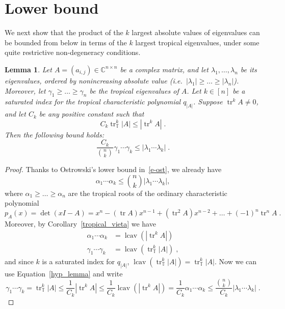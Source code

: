 \documentclass[a4paper]{amsart}
\theoremstyle{definition}
\theoremstyle{plain}
\newtheorem{lem}[thm]{Lemma}
\theoremstyle{remark}
\begin{document}
\section{Lower bound}\label{sec-lower}
We next show that the product of the $k$ largest absolute values of eigenvalues
can be bounded from below in terms of the $k$ largest tropical
eigenvalues, under some quite restrictive non-degeneracy conditions.
\begin{lem} \label{lower_bound_lemma}
 Let $A = (a_{i,j})\in\mathbb{C}^{n\times n}$ be a complex matrix, and let $\lambda_1,\dots,\lambda_n$ be its eigenvalues,
 ordered by nonincreasing absolute value (i.e.\ $|\lambda_1| {\geqslant} \dots {\geqslant} |\lambda_n|$).
 Moreover, let $\gamma_1 {\geqslant} \dots {\geqslant} \gamma_n$ be the tropical eigenvalues of $A$.
 Let $k\in[n]$
be a saturated index for the tropical characteristic polynomial $q_{|A|}$.
 Suppose $\operatorname{tr}^k A\neq 0$, and let $C_k$ be any positive constant such that
 \begin{equation} \label{hyp_lemma}
 C_k \operatorname{tr}^k_{{\mathbb{T}}} |A| {\leqslant} |\operatorname{tr}^k A| \; .
 \end{equation}
 Then the following bound holds:
 \[ \frac{C_k}{\binom{n}{k}} \gamma_1 \dotsm \gamma_k {\leqslant} |\lambda_1 \dotsm \lambda_k| \; . \]
\end{lem}
\begin{proof}
Thanks to Ostrowski's lower bound in~\eqref{e-ost},
we already have
\[ \alpha_1 \dotsm \alpha_k {\leqslant} \binom{n}{k} |\lambda_1\dotsm\lambda_k|, \]
where $\alpha_1{\geqslant}\dots{\geqslant}\alpha_n$ are the tropical roots
of the ordinary characteristic polynomial
\[ p_A(x) = \det (xI - A) = x^n - (\operatorname{tr} A) x^{n-1} + (\operatorname{tr}^2 A) x^{n-2} + \dots + (-1)^n \operatorname{tr}^n A \; . \]
Moreover, by Corollary~\ref{tropical_vieta} we have
\[ 
\begin{aligned}
	\alpha_1 \dotsm \alpha_k &= \operatorname{lcav}(|\operatorname{tr}^k A|) \\
	\gamma_1 \dotsm \gamma_k &= \operatorname{lcav}(\operatorname{tr}^k_{{\mathbb{T}}} |A|) \; ,
\end{aligned}
\]
and since $k$ is a saturated index for $q_{|A|}$, $\operatorname{lcav}(\operatorname{tr}^k_{{\mathbb{T}}} |A|) = \operatorname{tr}^k_{{\mathbb{T}}} |A|$.
Now we can use Equation~\eqref{hyp_lemma} and write
\[
\gamma_1 \dotsm \gamma_k = \operatorname{tr}^k_{{\mathbb{T}}}|A| {\leqslant} \frac{1}{C_k} |\operatorname{tr}^k A|
{\leqslant} \frac{1}{C_k} \operatorname{lcav} (|\operatorname{tr}^k A|) = \frac{1}{C_k} \alpha_1 \dotsm \alpha_k
{\leqslant} \frac{\binom{n}{k}}{C_k} |\lambda_1 \dotsm \lambda_k| \; .
\]
\end{proof}
\end{document}
